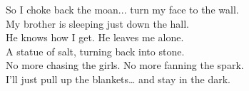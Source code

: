 \begin{lyrics}

So I choke back the moan... %
turn my face to the wall.\\
My brother is sleeping just down the hall.\\
He knows how I get. %
He leaves me alone.\\
A statue of salt, turning back into stone.\\
No more chasing the girls. %
No more fanning the spark.\\
I’ll just pull up the blankets… and stay in the dark.

\end{lyrics}

